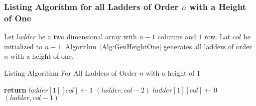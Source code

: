    \subsubsection{Listing Algorithm for all Ladders of Order $n$ with a Height of One}
   Let $ladder$ be a two dimensional array with $n-1$ columns and $1$ row.
   Lat $col$ be initialized to $n-1$. Algorithm~\ref{Alg:GenHeightOne} generates 
   all ladders of order $n$ with a height of one.
   \begin{algorithm}
        \caption{Listing Algorithm For All Ladders of Order $n$ with a height of $1$}
        \begin{algorithmic}[1]
                    \State \textbf{return}
                \EndIf
                \State $ladder[1][col] \gets 1$
                $(ladder, col-2)$
                \State $ladder[1][col] \gets 0$
                $(ladder, col-1)$


            \EndFunction
        \end{algorithmic}   
        \label{Alg:GenHeightOne} 
   \end{algorithm}

